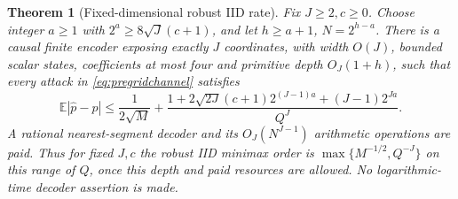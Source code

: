 \documentclass[11pt,letterpaper]{article}
\newtheorem{theorem}{Theorem}[section]
\theoremstyle{definition}\newtheorem{definition}[theorem]{Definition}
\theoremstyle{remark}\newtheorem{remark}[theorem]{Remark}
\newcommand{\E}{\mathbb{E}}
\begin{document}
\begin{theorem}[Fixed-dimensional robust IID rate]\label{thm:robustgrid}
Fix $J\ge2,c\ge0$. Choose integer $a\ge1$ with $2^a\ge8\sqrt J(c+1)$, and let $h\ge a+1$, $N=2^{h-a}$. There is a causal finite encoder exposing exactly $J$ coordinates, with width $O(J)$, bounded scalar states, coefficients at most four and primitive depth $O_J(1+h)$, such that every attack in \eqref{eq:pregridchannel} satisfies
\begin{equation}\label{eq:robustgridrisk}
 \E|\widehat p-p|
 \le\frac1{2\sqrt M}+
 \frac{1+2\sqrt{2J}(c+1)2^{(J-1)a}+(J-1)2^{Ja}}{Q^J}.
\end{equation}
A rational nearest-segment decoder and its $O_J(N^{J-1})$ arithmetic operations are paid. Thus for fixed $J,c$ the robust IID minimax order is $\max\{M^{-1/2},Q^{-J}\}$ on this range of $Q$, once this depth and paid resources are allowed. No logarithmic-time decoder assertion is made.
\end{theorem}
\end{document}
